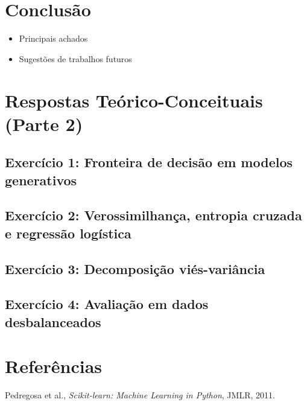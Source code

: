 \documentclass[a4paper,12pt]{article}
\begin{document}
\section{Conclusão}
\label{sec:conclusao}
\begin{itemize}
  \item Principais achados
  \item Sugestões de trabalhos futuros
\end{itemize}

\section{Respostas Teórico-Conceituais (Parte 2)}
\label{sec:teoria}

\subsection{Exercício 1: Fronteira de decisão em modelos generativos}
\label{subsec:ex1}

\subsection{Exercício 2: Verossimilhança, entropia cruzada e regressão logística}
\label{subsec:ex2}

\subsection{Exercício 3: Decomposição viés-variância}
\label{subsec:ex3}

\subsection{Exercício 4: Avaliação em dados desbalanceados}
\label{subsec:ex4}

\section{Referências}
\label{sec:referencias}
% 
% 

\begin{thebibliography}{9}
    Pedregosa et al.,
    \emph{Scikit-learn: Machine Learning in Python},
    JMLR, 2011.
\end{thebibliography}
\end{document}
